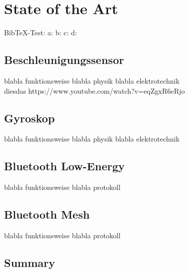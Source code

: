 \chapter{State of the Art}
\label{ch:background}

Bib\TeX-Test: a:\cite{amazondrohne} b:\citeauthor{amazondrohne} c:\citep{amazondrohne} d:\citet{amazondrohne}

\section{Beschleunigungssensor}
blabla funktionsweise blabla physik blabla elektrotechnik\\
diesdas https://www.youtube.com/watch?v=eqZgxR6eRjo

\section{Gyroskop}
blabla funktionsweise blabla physik blabla elektrotechnik

\section{Bluetooth Low-Energy}
blabla funktionsweise blabla protokoll

\section{Bluetooth Mesh}
blabla funktionsweise blabla protokoll

\section{Summary}